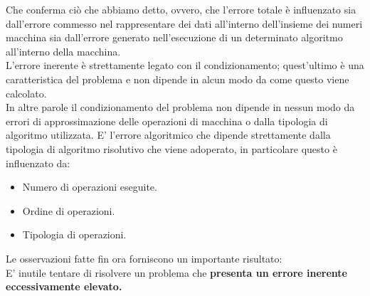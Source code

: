 \documentclass[12pt, a4paper]{book}
\theoremstyle{definition}
\begin{document}
\begin{flushleft}
Che conferma ciò che abbiamo detto, ovvero, che l'errore totale è influenzato sia dall'errore commesso nel rappresentare dei dati all'interno dell'insieme dei numeri macchina sia dall'errore generato nell'esecuzione di un determinato algoritmo all'interno della macchina.\\
\vspace{1em}
L'errore inerente è strettamente legato con il condizionamento; quest'ultimo è una caratteristica del problema e non dipende in alcun modo da come questo viene calcolato. \\
In altre parole il condizionamento del problema non dipende in nessun modo da errori di approssimazione delle operazioni di macchina o dalla tipologia di algoritmo utilizzata.
E' l’errore algoritmico che dipende strettamente dalla tipologia di algoritmo risolutivo che viene adoperato, in particolare questo è influenzato da: 
\begin{itemize}
	\item Numero di operazioni eseguite.
	\item Ordine di operazioni.
	\item Tipologia di operazioni.
\end{itemize}

Le osservazioni fatte fin ora forniscono un importante risultato:\\
E' inutile tentare di risolvere un problema che \textbf{presenta un errore inerente eccessivamente elevato.}
\end{flushleft}
\end{document}
